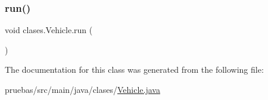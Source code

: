 \mbox{\label{classclases_1_1_vehicle_a1b1928593230ee67dd07c6023f615fa1}} 
\subsubsection{\texorpdfstring{run()}{run()}}
{\footnotesize\ttfamily void clases.\+Vehicle.\+run (\begin{DoxyParamCaption}{ }\end{DoxyParamCaption})}



The documentation for this class was generated from the following file\+:\begin{DoxyCompactItemize}
\item 
pruebas/src/main/java/clases/\mbox{\hyperlink{_vehicle_8java}{Vehicle.\+java}}\end{DoxyCompactItemize}
